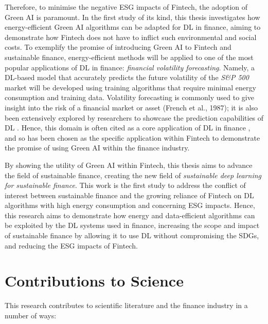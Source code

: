 \documentclass[a4paper, 11pt]{report}
\begin{document}
    Therefore, to minimise the negative ESG impacts of Fintech, the adoption of Green AI is paramount. In the first study of its kind, this thesis investigates how energy-efficient Green AI algorithms can be adapted for DL in finance, aiming to demonstrate how Fintech does not have to inflict such environmental and social costs. To exemplify the promise of introducing Green AI to Fintech and sustainable finance, energy-efficient methods will be applied to one of the most popular applications of DL in finance: \emph{financial volatility forecasting}. Namely, a DL-based model that accurately predicts the future volatility of the \emph{S\&P 500} market will be developed using training algorithms that require minimal energy consumption and training data. Volatility forecasting is commonly used to give insight into the risk of a financial market or asset (French et al., 1987); it is also been extensively explored by researchers to showcase the prediction capabilities of DL \citep{zhang-2022}. Hence, this domain is often cited as a core application of DL in finance \citep{thakkar-2021}, and so has been chosen as the specific application within Fintech to demonstrate the promise of using Green AI within the finance industry.

    By showing the utility of Green AI within Fintech, this thesis aims to advance the field of sustainable finance, creating the new field of \emph{sustainable deep learning for sustainable finance}. This work is the first study to address the conflict of interest between sustainable finance and the growing reliance of Fintech on DL algorithms with high energy consumption and concerning ESG impacts. Hence, this research aims to demonstrate how energy and data-efficient algorithms can be exploited by the DL systems used in finance, increasing the scope and impact of sustainable finance by allowing it to use DL without compromising the SDGs, and reducing the ESG impacts of Fintech.


    \section{Contributions to Science}
    \label{section: contributions}

    This research contributes to scientific literature and the finance industry in a number of ways:
\end{document}
